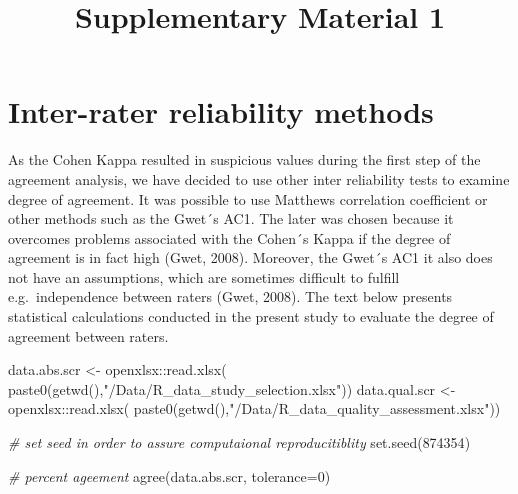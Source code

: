 \documentclass[
  man]{apa6}
\title{Supplementary Material 1}
\author{\phantom{0}}
\date{}
\affiliation{\phantom{0}}
\newenvironment{Shaded}{\begin{snugshade}}{\end{snugshade}}
\newcommand{\AttributeTok}[1]{\textcolor[rgb]{0.77,0.63,0.00}{#1}}
\newcommand{\CommentTok}[1]{\textcolor[rgb]{0.56,0.35,0.01}{\textit{#1}}}
\newcommand{\DecValTok}[1]{\textcolor[rgb]{0.00,0.00,0.81}{#1}}
\newcommand{\FunctionTok}[1]{\textcolor[rgb]{0.00,0.00,0.00}{#1}}
\newcommand{\NormalTok}[1]{#1}
\newcommand{\OtherTok}[1]{\textcolor[rgb]{0.56,0.35,0.01}{#1}}
\newcommand{\SpecialCharTok}[1]{\textcolor[rgb]{0.00,0.00,0.00}{#1}}
\newcommand{\StringTok}[1]{\textcolor[rgb]{0.31,0.60,0.02}{#1}}
\begin{document}
\maketitle

\hypertarget{inter-rater-reliability-methods}{%
\section{Inter-rater reliability methods}\label{inter-rater-reliability-methods}}

As the Cohen Kappa resulted in suspicious values during the first step of the agreement analysis, we have decided to use other inter reliability tests to examine degree of agreement. It was possible to use Matthews correlation coefficient or other methods such as the Gwet´s AC1. The later was chosen because it overcomes problems associated with the Cohen´s Kappa if the degree of agreement is in fact high (Gwet, 2008). Moreover, the Gwet´s AC1 it also does not have an assumptions, which are sometimes difficult to fulfill e.g.~independence between raters (Gwet, 2008). The text below presents statistical calculations conducted in the present study to evaluate the degree of agreement between raters.

\newpage

\begin{Shaded}
\begin{Highlighting}[]
\NormalTok{data.abs.scr }\OtherTok{\textless{}{-}}\NormalTok{ openxlsx}\SpecialCharTok{::}\FunctionTok{read.xlsx}\NormalTok{(}
  \FunctionTok{paste0}\NormalTok{(}\FunctionTok{getwd}\NormalTok{(),}\StringTok{"/Data/R\_data\_study\_selection.xlsx"}\NormalTok{))}
\NormalTok{data.qual.scr }\OtherTok{\textless{}{-}}\NormalTok{ openxlsx}\SpecialCharTok{::}\FunctionTok{read.xlsx}\NormalTok{(}
  \FunctionTok{paste0}\NormalTok{(}\FunctionTok{getwd}\NormalTok{(),}\StringTok{"/Data/R\_data\_quality\_assessment.xlsx"}\NormalTok{))}
\end{Highlighting}
\end{Shaded}

\begin{Shaded}
\begin{Highlighting}[]
\CommentTok{\# set seed in order to assure computaional reproducitiblity}
\FunctionTok{set.seed}\NormalTok{(}\DecValTok{874354}\NormalTok{)}

\CommentTok{\# percent ageement}
\FunctionTok{agree}\NormalTok{(data.abs.scr, }\AttributeTok{tolerance=}\DecValTok{0}\NormalTok{) }
\end{Highlighting}
\end{Shaded}
\end{document}
